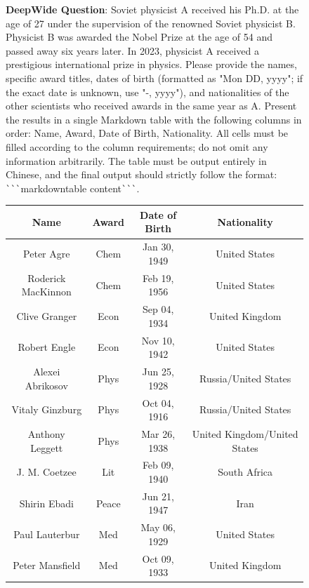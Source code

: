 \documentclass[11pt, letterpaper, logo, onecolumn, copyright, numbering]{paper_improved}
\begin{document}
\begin{figure}[htbp]
    \begin{tcolorbox}[
        title=Case Deep2Wide\_62 Instance (Core Entity is Nobel Proze),
        colback=yellow!10,
        colbacktitle=black!80,
        coltitle=white,
        arc=1mm,
        boxrule=0pt,
        breakable]
        \textbf{DeepWide Question}: Soviet physicist A received his Ph.D. at the age of 27 under the supervision of the renowned Soviet physicist B. Physicist B was awarded the Nobel Prize at the age of 54 and passed away six years later. In 2023, physicist A received a prestigious international prize in physics. Please provide the names, specific award titles, dates of birth (formatted as "Mon DD, yyyy"; if the exact date is unknown, use "-, yyyy"), and nationalities of the other scientists who received awards in the same year as A. Present the results in a single Markdown table with the following columns in order: Name, Award, Date of Birth, Nationality. All cells must be filled according to the column requirements; do not omit any information arbitrarily. The table must be output entirely in Chinese, and the final output should strictly follow the format: \verb|```|markdown{table content}\verb|```|.
    \end{tcolorbox}
    
    \begin{tcolorbox}
    [
        title=Ground-truth Table of Deep2Wide\_62 Instance,
        colback=green!10,
        colbacktitle=black!80,
        coltitle=white,
        arc=1mm,
        boxrule=0pt,
        breakable]
    \begin{center}
    \small
        \begin{tabular}{|c|c|c|c|}
        \toprule
        \textbf{Name} & \textbf{Award} & \textbf{Date of Birth} & \textbf{Nationality} \\\midrule
Peter Agre & Chem & Jan 30, 1949 & United States \\
Roderick MacKinnon & Chem & Feb 19, 1956 & United States \\
Clive Granger & Econ & Sep 04, 1934 & United Kingdom \\
Robert Engle & Econ & Nov 10, 1942 & United States \\
Alexei Abrikosov & Phys & Jun 25, 1928 & Russia/United States \\
Vitaly Ginzburg & Phys & Oct 04, 1916 & Russia/United States \\
Anthony Leggett & Phys & Mar 26, 1938 & United Kingdom/United States \\
J. M. Coetzee & Lit & Feb 09, 1940 & South Africa \\
Shirin Ebadi & Peace & Jun 21, 1947 & Iran \\
Paul Lauterbur & Med & May 06, 1929 & United States \\
Peter Mansfield & Med & Oct 09, 1933 & United Kingdom \\
        \bottomrule
        \end{tabular}
        \end{center}
    \end{tcolorbox}


\end{figure}
\end{document}
